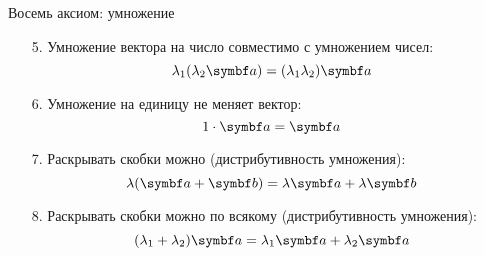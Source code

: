 \begin{frame}{Восемь аксиом: умножение}
\begin{enumerate}[resume]
    \item[5.] Умножение вектора на число \alert{совместимо} с умножением чисел:
    \[
    \lambda_1 (\lambda_2\ba) = (\lambda_1 \lambda_2 ) \ba
    \]
    \item[6.]  Умножение на \alert{единицу} не меняет вектор:
    \[
    1\cdot \ba= \ba
    \]
    \item[7.] Раскрывать скобки можно (\alert{дистрибутивность умножения}):
    \[
    \lambda (\ba + \bb) = \lambda \ba + \lambda \bb
    \]
    \item[8.] Раскрывать скобки можно по всякому (\alert{дистрибутивность умножения}):
    \[
    (\lambda_1 + \lambda_2) \ba = \lambda_1 \ba + \lambda_2 \ba
    \]
\end{enumerate}

\end{frame}